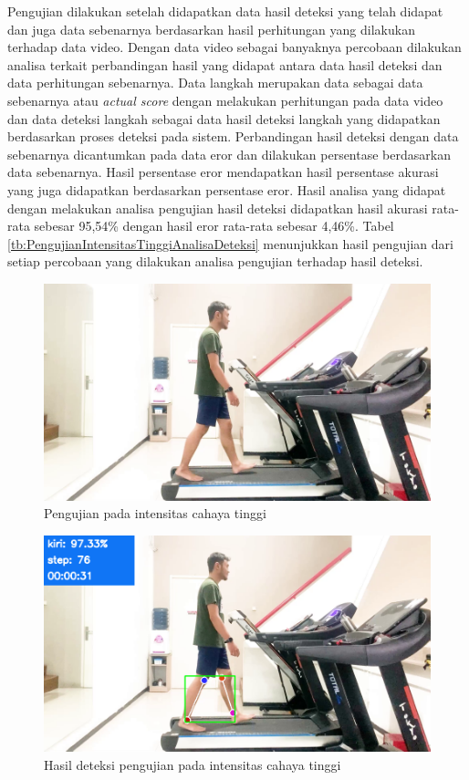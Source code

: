 Pengujian dilakukan setelah didapatkan data hasil deteksi yang telah didapat dan juga data sebenarnya berdasarkan hasil perhitungan yang dilakukan terhadap data video. Dengan data video sebagai banyaknya percobaan dilakukan analisa terkait perbandingan hasil yang didapat antara data hasil deteksi dan data perhitungan sebenarnya. Data langkah merupakan data sebagai data sebenarnya atau \emph{actual score} dengan melakukan perhitungan pada data video dan data deteksi langkah sebagai data hasil deteksi langkah yang didapatkan berdasarkan proses deteksi pada sistem. Perbandingan hasil deteksi dengan data sebenarnya dicantumkan pada data eror dan dilakukan persentase berdasarkan data sebenarnya. Hasil persentase eror mendapatkan hasil persentase akurasi yang juga didapatkan berdasarkan persentase eror. Hasil analisa yang didapat dengan melakukan analisa pengujian hasil deteksi didapatkan hasil akurasi rata-rata sebesar 95,54\% dengan hasil eror rata-rata sebesar 4,46\%. Tabel \ref{tb:PengujianIntensitasTinggiAnalisaDeteksi} menunjukkan hasil pengujian dari setiap percobaan yang dilakukan analisa pengujian terhadap hasil deteksi.

\begin{figure}[H]
  \centering
  \includegraphics[scale=0.5]{gambar/cahaya_tinggi.png}
  \caption{Pengujian pada intensitas cahaya tinggi}
  \label{fig:PengujianIntensitasTinggi}
\end{figure}

\begin{figure}[H]
  \centering
  \includegraphics[scale=0.5]{gambar/cahaya_tinggi2.png}
  \caption{Hasil deteksi pengujian pada intensitas cahaya tinggi}
  \label{fig:PengujianIntensitasTinggi2}
\end{figure}




